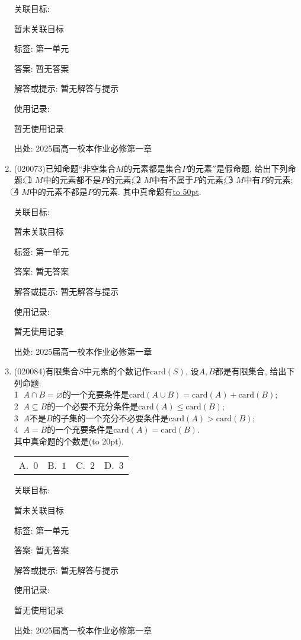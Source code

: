 \documentclass[10pt,a4paper]{article}
\newcommand{\blank}[1]{\underline{\hbox to #1pt{}}}
\newcommand{\bracket}[1]{(\hbox to #1pt{})}
\newcommand{\fourch}[4]{\par\begin{tabular}{p{.23\textwidth}p{.23\textwidth}p{.23\textwidth}p{.23\textwidth}}
A.~#1 &B.~#2& C.~#3& D.~#4
\end{tabular}}
\begin{document}
\begin{enumerate}[1.]
关联目标:

暂未关联目标



标签: 第一单元

答案: 暂无答案

解答或提示: 暂无解答与提示

使用记录:

暂无使用记录


出处: 2025届高一校本作业必修第一章
\item { (020073)}已知命题``非空集合$M$的元素都是集合$P$的元素$''$是假命题, 给出下列命题: \textcircled{1} $M$中的元素都不是$P$的元素; \textcircled{2} $M$中有不属于$P$的元素; \textcircled{3} $M$中有$P$的元素; \textcircled{4} $M$中的元素不都是$P$的元素. 其中真命题有\blank{50}.


关联目标:

暂未关联目标



标签: 第一单元

答案: 暂无答案

解答或提示: 暂无解答与提示

使用记录:

暂无使用记录


出处: 2025届高一校本作业必修第一章
\item { (020084)}有限集合$S$中元素的个数记作$\mathrm{card}(S)$, 设$A,B$都是有限集合, 给出下列命题:\\
\textcircled{1} $A\cap B=\varnothing$的一个充要条件是$\mathrm{card}(A\cup B)=\mathrm{card}(A)+\mathrm{card}(B)$;\\
\textcircled{2} $A\subseteq B$的一个必要不充分条件是$\mathrm{card}(A)\le \mathrm{card}(B)$; \\
\textcircled{3} $A$不是$B$的子集的一个充分不必要条件是$\mathrm{card}(A)>\mathrm{card}(B)$;\\ 
\textcircled{4} $A=B$的一个充要条件是$\mathrm{card}(A)=\mathrm{card}(B)$.\\ 
其中真命题的个数是\bracket{20}.
\fourch{$0$}{$1$}{$2$}{$3$}


关联目标:

暂未关联目标



标签: 第一单元

答案: 暂无答案

解答或提示: 暂无解答与提示

使用记录:

暂无使用记录


出处: 2025届高一校本作业必修第一章
\end{enumerate}
\end{document}
